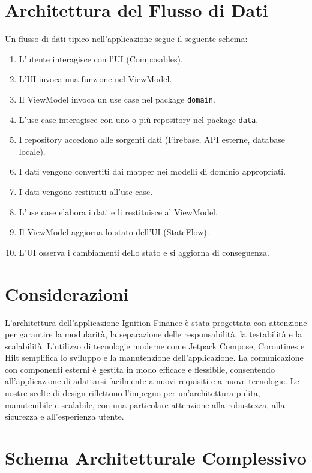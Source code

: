 \documentclass{article}
\begin{document}
\section{Architettura del Flusso di
Dati}\label{sec:architettura-del-flusso-di-dati}

Un flusso di dati tipico nell'applicazione segue il seguente schema:

\begin{enumerate}
\item L'utente interagisce con l'UI (Composables).
\item L'UI invoca una funzione nel ViewModel.
\item Il ViewModel invoca un use case nel package \texttt{domain}.
\item L'use case interagisce con uno o più repository nel package \texttt{data}.
\item I repository accedono alle sorgenti dati (Firebase, API esterne, database
locale).
\item I dati vengono convertiti dai mapper nei modelli di dominio appropriati.
\item I dati vengono restituiti all'use case.
\item L'use case elabora i dati e li restituisce al ViewModel.
\item Il ViewModel aggiorna lo stato dell'UI (StateFlow).
\item L'UI osserva i cambiamenti dello stato e si aggiorna di conseguenza.
\end{enumerate}

\section{Considerazioni}\label{sec:considerazioni}

L'architettura dell'applicazione Ignition Finance è stata progettata con
attenzione per garantire la modularità, la separazione delle responsabilità, la
testabilità e la scalabilità.
L'utilizzo di tecnologie moderne come Jetpack
Compose, Coroutines e Hilt semplifica lo sviluppo e la manutenzione
dell'applicazione.
La comunicazione con componenti esterni è gestita in modo
efficace e flessibile, consentendo all'applicazione di adattarsi facilmente a
nuovi requisiti e a nuove tecnologie.
Le nostre scelte di design riflettono
l'impegno per un'architettura pulita, manutenibile e scalabile, con una
particolare attenzione alla robustezza, alla sicurezza e all'esperienza utente.
\vspace{7cm}
\section{Schema Architetturale
Complessivo}\label{sec:schema-architetturale-complessivo}
\vspace{2cm}
\vspace{10cm}
\end{document}
